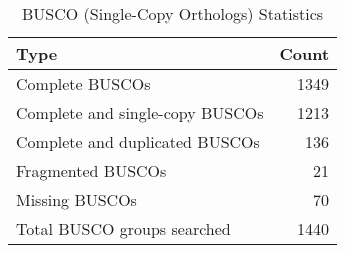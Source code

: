 \begin{table}[ht]
  \begin{center}
    \caption{BUSCO (Single-Copy Orthologs) Statistics}
    \begin{tabular}{lr}
      \toprule
      Type & Count\\
      \midrule
      Complete BUSCOs & 1349\\
      Complete and single-copy BUSCOs & 1213\\
      Complete and duplicated BUSCOs & 136\\
      Fragmented BUSCOs & 21\\
      Missing BUSCOs & 70\\
      Total BUSCO groups searched & 1440\\
      \bottomrule
    \end{tabular}
  \end{center}
\end{table}

